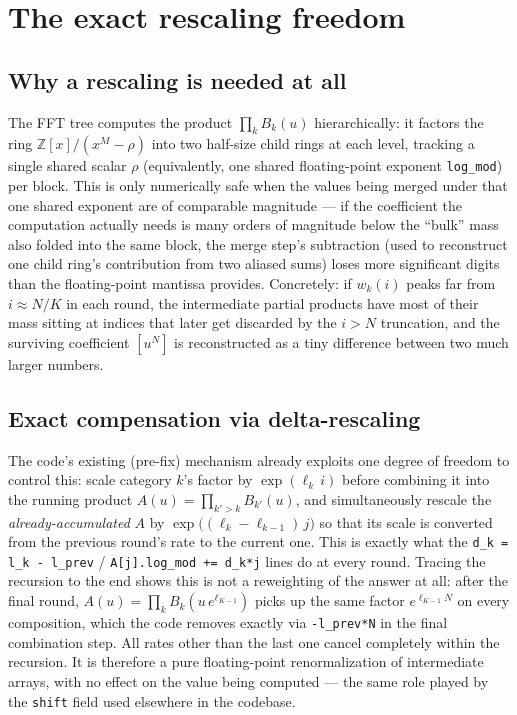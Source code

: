 \documentclass[11pt]{article}
\begin{document}
\section{The exact rescaling freedom}
\label{sec:rescaling}

\subsection{Why a rescaling is needed at all}

The FFT tree computes the product $\prod_k B_k(u)$ hierarchically: it factors the ring
$\mathbb Z[x]/(x^{M}-\rho)$ into two half-size child rings at each level, tracking a
single shared scalar $\rho$ (equivalently, one shared floating-point exponent
\texttt{log\_mod}) per block. This is only numerically safe when the values being merged
under that one shared exponent are of comparable magnitude --- if the coefficient the
computation actually needs is many orders of magnitude below the ``bulk'' mass also
folded into the same block, the merge step's subtraction (used to reconstruct one child
ring's contribution from two aliased sums) loses more significant digits than the
floating-point mantissa provides. Concretely: if $w_k(i)$ peaks far from $i \approx N/K$
in each round, the intermediate partial products have most of their mass sitting at
indices that later get discarded by the $i>N$ truncation, and the surviving coefficient
$[u^N]$ is reconstructed as a tiny difference between two much larger numbers.

\subsection{Exact compensation via delta-rescaling}

The code's existing (pre-fix) mechanism already exploits one degree of freedom to
control this: scale category $k$'s factor by $\exp(\ell_k\, i)$ before combining it into
the running product $A(u) = \prod_{k'>k} B_{k'}(u)$, and simultaneously rescale the
\emph{already-accumulated} $A$ by $\exp\big((\ell_k-\ell_{k-1})\, j\big)$ so that its
scale is converted from the previous round's rate to the current one. This is exactly
what the \texttt{d\_k = l\_k - l\_prev} / \texttt{A[j].log\_mod += d\_k*j} lines do at
every round. Tracing the recursion to the end shows this is not a reweighting of the
answer at all: after the final round, $A(u) = \prod_k B_k\!\left(u\, e^{\ell_{K-1}}\right)$
picks up the same factor $e^{\ell_{K-1} N}$ on every composition, which the code removes
exactly via \texttt{-l\_prev*N} in the final combination step. All rates other than the
last one cancel completely within the recursion. It is therefore a pure floating-point
renormalization of intermediate arrays, with no effect on the value being computed ---
the same role played by the \texttt{shift} field used elsewhere in the codebase.
\end{document}
